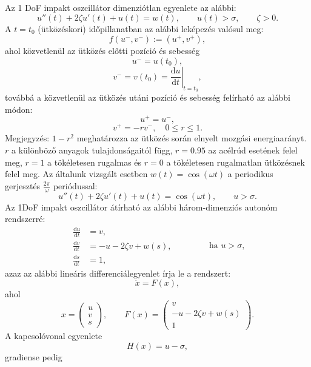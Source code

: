 Az 1 DoF impakt oszcillátor dimenziótlan egyenlete az alábbi:
\begin{equation}
u''(t)+2\zeta u'(t)+u(t)=w(t),\qquad u(t)>\sigma,\qquad \zeta>0.
\end{equation}
A $t=t_0$ (ütközéskori) időpillanatban az alábbi leképezés valósul meg:
\begin{equation}
f(u^-,v^-):=(u^+,v^+),
\end{equation}
ahol közvetlenül az ütközés előtti pozíció és sebesség
\begin{equation}
u^-=u(t_0),
\end{equation}
\begin{equation}
v^-=v(t_0)=\left.\frac{\mathrm{d}u}{\mathrm{d}t}\right|_{t=t_0},
\end{equation}
továbbá a közvetlenül az ütközés utáni pozíció és sebesség felírható az alábbi módon:
\begin{equation}
u^+=u^-,
\end{equation}
\begin{equation}
v^+=-rv^-, \quad 0\le r\le 1.
\end{equation}
Megjegyzés: $1-r^2$ meghatározza az ütközés során elnyelt mozgási energiaarányt. $r$ a különböző anyagok tulajdonságaitól függ, $r=0.95$ az acélrúd esetének felel meg, $r=1$ a tökéletesen rugalmas és $r=0$ a tökéletesen rugalmatlan ütközésnek felel meg. Az általunk vizsgált esetben $w(t)=\cos(\omega t)$ a periodikus gerjesztés $\frac{2\pi}{\omega}$ periódussal:
\begin{equation}
u''(t)+2\zeta u'(t)+u(t)=\cos(\omega t),\qquad u>\sigma.
\end{equation}
Az 1DoF impakt oszcillátor átírható az alábbi három-dimenziós autonóm rendszerré:
\begin{equation}
\begin{split}
\frac{\mathrm{d}u}{\mathrm{d}t}&=v,\\
\frac{\mathrm{d}v}{\mathrm{d}t}&=-u-2\zeta v+w(s),\\
\frac{\mathrm{d}s}{\mathrm{d}t}&=1,
\end{split}\qquad \qquad \text{ha } u>\sigma,
\end{equation}
azaz az alábbi lineáris differenciálegyenlet írja le a rendszert:
\begin{equation}
\dot{x}=F(x),
\end{equation}
ahol
\begin{equation}\label{eq:xFx}
x=\begin{pmatrix}
u\\ v\\ s
\end{pmatrix},\qquad
F(x)=\begin{pmatrix}
v\\
-u-2\zeta v+w(s)\\
1
\end{pmatrix}.
\end{equation}
A kapcsolóvonal egyenlete
\begin{equation}
H(x)=u-\sigma,
\end{equation}
gradiense pedig

